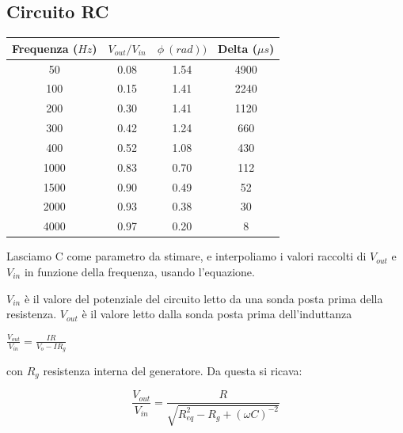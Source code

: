 \subsection*{Circuito RC}


\begin{center}

\begin{tabular}{*{4}{c}}
Frequenza ($Hz$) & $V_{out}/V_{in}$ & $\phi\ (rad))$ & Delta ($\mu s$)\\
\midrule
50 & 0.08 & 1.54 & 4900\\
100 & 0.15 & 1.41 & 2240\\
200 & 0.30 & 1.41 & 1120\\
300 & 0.42 & 1.24 & 660\\
400 & 0.52 & 1.08 & 430\\
1000 & 0.83 & 0.70 & 112\\
1500 & 0.90 & 0.49 & 52\\
2000 & 0.93 & 0.38 & 30\\
4000 & 0.97 & 0.20 & 8\\

\end{tabular}
\end{center}

Lasciamo C come parametro da stimare, e interpoliamo i valori raccolti di $V_{out}$ e $V_{in}$ in funzione della frequenza, usando l'equazione.

$V_{in}$ è il valore del potenziale del circuito letto da una sonda posta prima della resistenza.
$V_{out}$ è il valore letto dalla sonda posta prima dell'induttanza 

$\frac{V_{out }}{V_{in}} = \frac{IR}{V_o - IR_g}$

con $R_g$ resistenza interna del generatore. Da questa si ricava:

$$\frac{V_{out}}{V_{in}} = \frac{R}{\sqrt{R_{eq}^2 - R_g +(\omega C)^{-2}}}$$


